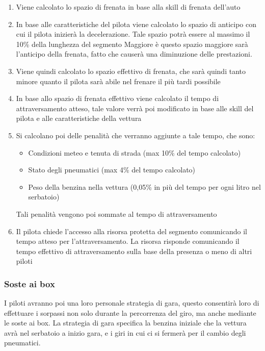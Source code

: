 \documentclass[a4paper,11pt, twoside]{book}
\begin{document}
	  \begin{enumerate}
	    \item Viene calcolato lo spazio di frenata in base alla skill di frenata dell'auto
	    \item In base alle caratteristiche del pilota viene calcolato lo spazio di anticipo con cui il
		  pilota inizierà la decelerazione. Tale spazio potrà essere al massimo il 10\% della lunghezza del segmento
		  Maggiore è questo spazio maggiore sarà l'anticipo della frenata, fatto che causerà una diminuzione delle prestazioni.
	    \item Viene quindi calcolato lo spazio effettivo di frenata, che sarà quindi tanto minore quanto
		  il pilota sarà abile nel frenare il più tardi possibile
	    \item In base allo spazio di frenata effettivo viene calcolato il tempo di attraversamento atteso, tale valore
	          verrà poi modificato in base alle skill del pilota e alle caratteristiche della vettura
	    \item Si calcolano poi delle penalità che verranno aggiunte a tale tempo, che sono:
		  \begin{itemize}
		    \item Condizioni meteo e tenuta di strada (max 10\% del tempo calcolato)
		    \item Stato degli pneumatici (max 4\% del tempo calcolato)
		    \item Peso della benzina nella vettura (0,05\% in più del tempo per ogni litro nel serbatoio)
		  \end{itemize}
		  Tali penalità vengono poi sommate al tempo di attraversamento
	    \item Il pilota chiede l'accesso alla risorsa protetta del segmento
		  comunicando il tempo atteso per l'attraversamento. La risorsa risponde comunicando il tempo
		  effettivo di attraversamento sulla base della presenza o meno di altri piloti
	  \end{enumerate}
	  
	  

	\subsubsection{Soste ai box}
	  I piloti avranno poi una loro personale strategia di gara, questo consentirà loro di effettuare
	  i sorpassi non solo durante la percorrenza del giro, ma anche mediante le soste ai box.
	  La strategia di gara specifica la benzina iniziale che la vettura avrà nel serbatoio a inizio gara,
	  e i giri in cui ci si fermerà per il cambio degli pneumatici.
	  
\end{document}
